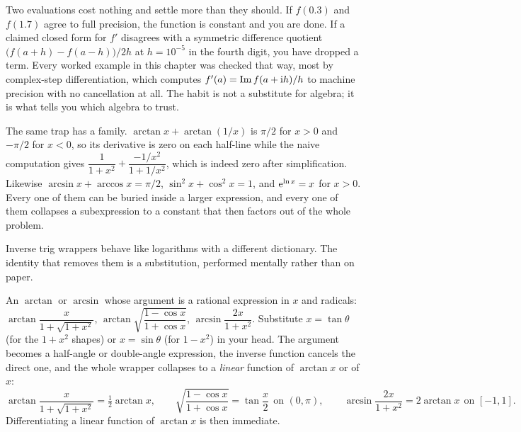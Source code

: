 \begin{keynote}
Two evaluations cost nothing and settle more than they should. If $f(0.3)$ and $f(1.7)$ agree to full precision, the function is constant and you are done. If a claimed closed form for $f'$ disagrees with a symmetric difference quotient $\bigl(f(a+h)-f(a-h)\bigr)/2h$ at $h=10^{-5}$ in the fourth digit, you have dropped a term. Every worked example in this chapter was checked that way, most by complex-step differentiation, which computes $f'(a)=\operatorname{Im}f(a+\mathrm{i} h)/h$ to machine precision with no cancellation at all. The habit is not a substitute for algebra; it is what tells you which algebra to trust.
\end{keynote}

The same trap has a family. $\arctan x+\arctan(1/x)$ is $\pi/2$ for $x>0$ and $-\pi/2$ for $x<0$, so its derivative is zero on each half-line while the naive computation gives $\dfrac{1}{1+x^{2}}+\dfrac{-1/x^{2}}{1+1/x^{2}}$, which is indeed zero after simplification. Likewise $\arcsin x+\arccos x=\pi/2$, $\sin^{2}x+\cos^{2}x=1$, and $\mathrm{e}^{\ln x}=x$ for $x>0$. Every one of them can be buried inside a larger expression, and every one of them collapses a subexpression to a constant that then factors out of the whole problem.

Inverse trig wrappers behave like logarithms with a different dictionary. The identity that removes them is a substitution, performed mentally rather than on paper.

\cue An $\arctan$ or $\arcsin$ whose argument is a rational expression in $x$ and radicals: $\arctan\dfrac{x}{1+\sqrt{1+x^{2}}}$, $\arctan\sqrt{\dfrac{1-\cos x}{1+\cos x}}$, $\arcsin\dfrac{2x}{1+x^{2}}$.
\method Substitute $x=\tan\theta$ (for the $1+x^{2}$ shapes) or $x=\sin\theta$ (for $1-x^{2}$) in your head. The argument becomes a half-angle or double-angle expression, the inverse function cancels the direct one, and the whole wrapper collapses to a \emph{linear} function of $\arctan x$ or of $x$:
\[
\arctan\frac{x}{1+\sqrt{1+x^{2}}}=\tfrac12\arctan x,\qquad
\sqrt{\frac{1-\cos x}{1+\cos x}}=\tan\frac{x}{2}\ \ \text{on }(0,\pi),\qquad
\arcsin\frac{2x}{1+x^{2}}=2\arctan x\ \ \text{on }[-1,1].
\]
Differentiating a linear function of $\arctan x$ is then immediate.

